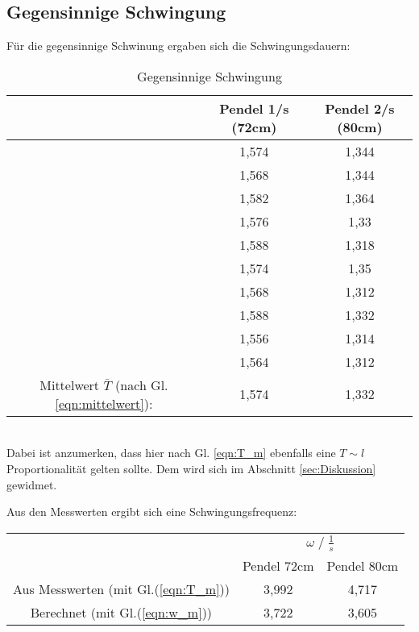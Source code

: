 \subsection{Gegensinnige Schwingung}
Für die gegensinnige Schwinung ergaben sich die Schwingungsdauern:
\begin{table}
    \centering
    \label{tab:Data_gegenphasig}
    \begin{tabular}{c c | c}
        \toprule
        & Pendel 1\;/\;s (72cm) & Pendel 2\;/\;s (80cm)\\
        \midrule
        & 1,574 & 1,344 \\
        & 1,568 & 1,344 \\
        & 1,582 & 1,364 \\
        & 1,576 & 1,33  \\
        & 1,588 & 1,318 \\
        & 1,574 & 1,35  \\
        & 1,568 & 1,312 \\
        & 1,588 & 1,332 \\
        & 1,556 & 1,314 \\
        & 1,564 & 1,312 \\
        \midrule
        Mittelwert $\bar{T}$ (nach Gl. \ref{eqn:mittelwert}): & 1,574 & 1,332 \\
        \bottomrule
    \end{tabular}
    \caption{Gegensinnige Schwingung}
\end{table}
\\Dabei ist anzumerken, dass hier nach Gl. \ref{eqn:T_m} ebenfalls eine $T \sim l$ Proportionalität
gelten sollte. Dem wird sich im Abschnitt \ref{sec:Diskussion} gewidmet.\newline

Aus den Messwerten ergibt sich eine Schwingungsfrequenz:
\begin{table}
    \centering
    \label{tab:frq_gegens}
    \begin{tabular}{c c c}
        \toprule
        & \multicolumn{2}{c}{$\omega\;/\;\frac{1}{s}$}\\
        \cmidrule(lr){2-3} 
        & Pendel 72cm & Pendel 80cm\\
        \midrule
        Aus Messwerten (mit Gl.(\ref{eqn:T_m})) & 3,992 & 4,717 \\
        Berechnet (mit Gl.(\ref{eqn:w_m}))      & 3,722 & 3,605 \\
        \bottomrule
    \end{tabular}
\end{table}
\newpage
